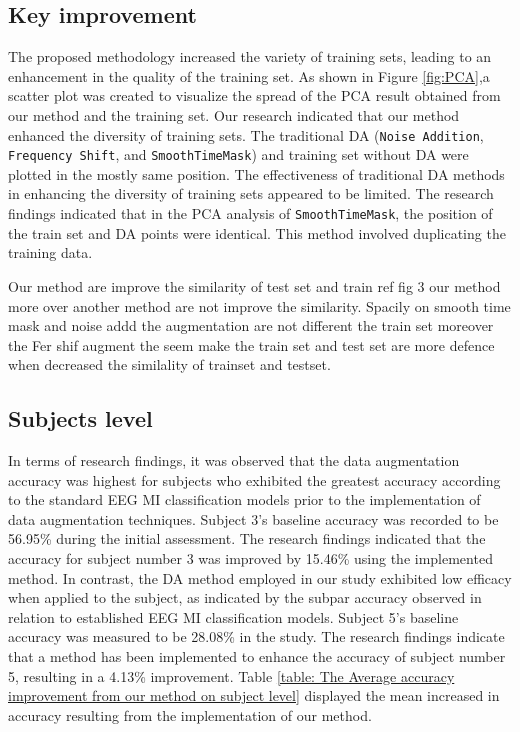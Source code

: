 \documentclass[runningheads]{llncs}
\begin{document}
\subsection{Key improvement}

The proposed methodology increased the variety of training sets, leading to an enhancement in the quality of the training set. As shown in Figure \ref{fig:PCA},a scatter plot was created to visualize the spread of the PCA result obtained from our method and the training set. Our research indicated that our method enhanced the diversity of training sets. The traditional DA (\texttt{Noise Addition}, \texttt{Frequency Shift}, and \texttt{\texttt{SmoothTimeMask}}) and training set without DA were plotted in the mostly same position. The effectiveness of traditional DA methods in enhancing the diversity of training sets appeared to be limited. The research findings indicated that in the PCA analysis of \texttt{\texttt{SmoothTimeMask}}, the position of the train set and DA points were identical. This method involved duplicating the training data. 

Our method are improve the similarity of test set and train ref fig 3 our method more over another method are not improve the similarity. Spacily on smooth time mask and noise addd the augmentation are not different the train set moreover the Fer shif augment the seem make the train set and test set are more defence when decreased  the similality of trainset and testset.


\subsection{Subjects level}

In terms of research findings, it was observed that the data augmentation accuracy was highest for subjects who exhibited the greatest accuracy according to the standard EEG MI classification models prior to the implementation of data augmentation techniques. Subject 3's baseline accuracy was recorded to be 56.95\% during the initial assessment. The research findings indicated that the accuracy for subject number 3 was improved by 15.46\% using the implemented method. In contrast, the DA method employed in our study exhibited low efficacy when applied to the subject, as indicated by the subpar accuracy observed in relation to established EEG MI classification models. 
Subject 5's baseline accuracy was measured to be 28.08\% in the study. The research findings indicate that a method has been implemented to enhance the accuracy of subject number 5, resulting in a 4.13\% improvement. Table \ref{table: The Average accuracy improvement from our method on subject level} displayed the mean increased in accuracy resulting from the implementation of our method.
 
\end{document}
